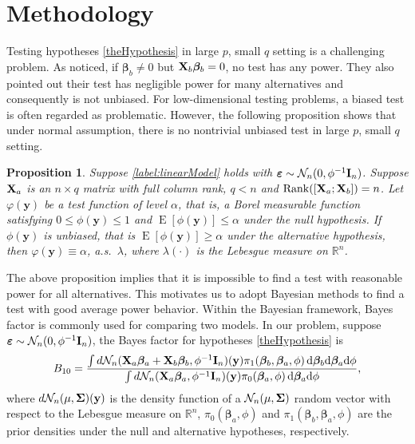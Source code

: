 \documentclass[11pt]{article}
\DeclareMathOperator{\myRank}{Rank}
\DeclareMathOperator{\myE}{E}
\newcommand{\By}{\mathbf{y}}    \newcommand{\Bz}{\mathbf{z}}
\newcommand{\bfsym}[1]{\ensuremath{\boldsymbol{#1}}}
\def\bbeta{\bfsym \beta}
\theoremstyle{plain}
\newtheorem{proposition}{\quad\quad Proposition}
\theoremstyle{definition}
\theoremstyle{remark}
\begin{document}
\section{Methodology}\label{sec:methodology}
Testing hypotheses \eqref{theHypothesis} in large $p$, small $q$ setting is a challenging problem.
As \cite{Goeman2006} noticed, if $\bbeta_b \neq 0$ but $\BX_b \bbeta_b =0$, no test has any power.
They also pointed out their test has negligible power for many alternatives and consequently is not unbiased.
For low-dimensional testing problems, a biased test is often regarded as problematic.
However, the following proposition shows that under normal assumption, there is no nontrivial unbiased test in large $p$, small $q$ setting.
\begin{proposition}\label{prop:unbiased}
    Suppose \eqref{label:linearModel} holds with
$\bepsilon\sim \mathcal N_n (0, \phi^{-1}\BI_n)$.
Suppose $\mathbf{X}_a$ is an $n\times q$ matrix with full column rank, $q<n$ and $\myRank( [\BX_a;\BX_b])=n$.
Let $\varphi(\By)$ be a test function of level $\alpha$, that is, a Borel measurable function satisfying $0\leq \phi(\By)\leq 1$ and $\myE [\phi(\By)]\leq \alpha$ under the null hypothesis.
If $\phi(\By)$ is unbiased, that is $\myE [\phi(\By)]\geq \alpha$ under the alternative hypothesis, then $\varphi(\By)\equiv\alpha$, a.s.\ $\lambda$, where $\lambda(\cdot)$ is the Lebesgue measure on $\mathbb R^n$.
\end{proposition}
The above proposition implies that it is impossible to find a test with reasonable power for all alternatives.
This motivates us to adopt Bayesian methods %
to find a test with good average power behavior.
Within the Bayesian framework, Bayes factor is commonly used for comparing two models.
In our problem, suppose $\bepsilon \sim \mathcal N_n (0,\phi^{-1} \BI_n)$, the Bayes factor for hypotheses \eqref{theHypothesis} is
\begin{equation*}
    B_{10}= \frac {
        \int d\mathcal N_n(\BX_a\bbeta_a + \BX_b\bbeta_b, \phi^{-1}\BI_n) (\By) \pi_1(\bbeta_b,\bbeta_a,\phi)\, \mathrm d\bbeta_b \mathrm d\bbeta_a \mathrm d\phi
}{
    \int d\mathcal N_n(\BX_a\bbeta_a, \phi^{-1} \BI_n)(\By) \pi_0(\bbeta_a,\phi) \, \mathrm d\bbeta_a \mathrm d\phi
    },
\end{equation*}
where $d\mathcal N_n(\mu, \bSigma)(\By)$ is the density function of a $\mathcal N_n(\mu,\bSigma) $ random vector with respect to the Lebesgue measure on $\mathbb R^n$,  $\pi_0(\bbeta_a,\phi)$ and $\pi_1(\bbeta_b,\bbeta_a,\phi)$ are the prior densities under the null and alternative hypotheses, respectively.
\end{document}
